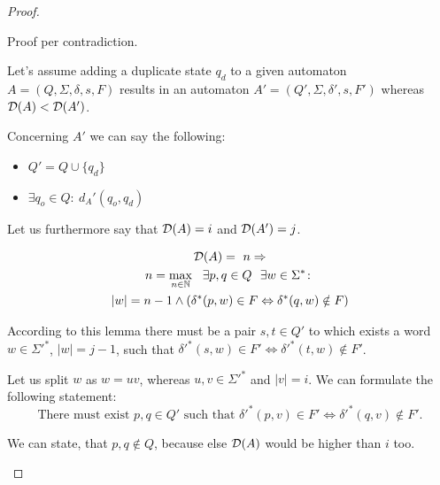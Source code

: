 \begin{proof}
	\begin{description}
		\item
		
		Proof per contradiction.
		
		Let's assume adding a duplicate state $q_d$ to a given automaton $A = (Q, \Sigma, \delta, s, F)$ results in an automaton $A' = (Q', \Sigma, \delta', s, F')$ whereas $\mathcal{D}(A) < \mathcal{D}(A')$.
		
		Concerning $A'$ we can say the following:
		\begin{itemize}
			\item $Q' = Q \cup \{ q_d \}$
			\item $\exists q_o \in Q \colon\ d_A'(q_o, q_d)$
		\end{itemize}
		Let us furthermore say that $\mathcal{D}(A) = i$ and $\mathcal{D}(A') = j$.
		
		\begin{lemma}
			\begin{multline*}
			\mathcal{D}(A) =\ n \Rightarrow \\
			n = \max_{n \in \mathbb{N}}\ \ \exists p, q \in Q\ \ \exists w \in \Sigma^* \colon \\
			|w| = n - 1 \land (\delta^*(p,w) \in F \Leftrightarrow \delta^*(q,w) \notin F)
			\end{multline*}
		\end{lemma}
		According to this lemma there must be a pair $s, t \in Q'$ to which exists a word $w \in \Sigma'^*$, $|w| = j - 1$, such that $\delta'^*(s,w) \in F' \Leftrightarrow \delta'^*(t,w) \notin F'$.
		
		Let us split $w$ as $w = uv$, whereas $u,v \in\Sigma'^*$ and $|v| = i$. We can formulate the following statement:
		\begin{equation}
		\text{There must exist }p, q \in Q'\text{ such that }\delta'^*(p,v) \in F' \Leftrightarrow \delta'^*(q,v) \notin F'.
		\end{equation}
		
		
		We can state, that $p, q \notin Q$, because else $\mathcal{D}(A)$ would be higher than $i$ too. 
		

\end{description}
\end{proof}
